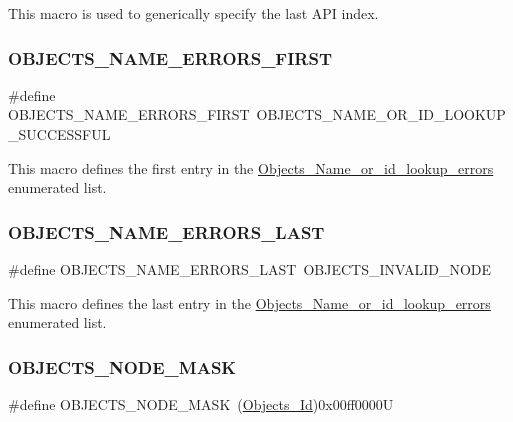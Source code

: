This macro is used to generically specify the last A\+PI index. \mbox{\label{group__RTEMSScoreObject_ga046df47371da1bd4f95bc63dcfea51c4}} 
\subsubsection{\texorpdfstring{OBJECTS\_NAME\_ERRORS\_FIRST}{OBJECTS\_NAME\_ERRORS\_FIRST}}
{\footnotesize\ttfamily \#define O\+B\+J\+E\+C\+T\+S\+\_\+\+N\+A\+M\+E\+\_\+\+E\+R\+R\+O\+R\+S\+\_\+\+F\+I\+R\+ST~O\+B\+J\+E\+C\+T\+S\+\_\+\+N\+A\+M\+E\+\_\+\+O\+R\+\_\+\+I\+D\+\_\+\+L\+O\+O\+K\+U\+P\+\_\+\+S\+U\+C\+C\+E\+S\+S\+F\+UL}

This macro defines the first entry in the \mbox{\hyperlink{group__RTEMSScoreObject_gaccfeec04954711c389b10aeccc91cabe}{Objects\+\_\+\+Name\+\_\+or\+\_\+id\+\_\+lookup\+\_\+errors}} enumerated list. \mbox{\label{group__RTEMSScoreObject_ga1452cd19bcd8b5e8a580729e854a1444}} 
\subsubsection{\texorpdfstring{OBJECTS\_NAME\_ERRORS\_LAST}{OBJECTS\_NAME\_ERRORS\_LAST}}
{\footnotesize\ttfamily \#define O\+B\+J\+E\+C\+T\+S\+\_\+\+N\+A\+M\+E\+\_\+\+E\+R\+R\+O\+R\+S\+\_\+\+L\+A\+ST~O\+B\+J\+E\+C\+T\+S\+\_\+\+I\+N\+V\+A\+L\+I\+D\+\_\+\+N\+O\+DE}

This macro defines the last entry in the \mbox{\hyperlink{group__RTEMSScoreObject_gaccfeec04954711c389b10aeccc91cabe}{Objects\+\_\+\+Name\+\_\+or\+\_\+id\+\_\+lookup\+\_\+errors}} enumerated list. \mbox{\label{group__RTEMSScoreObject_gaffe377d24973dea94eb29a2c4e8dc47d}} 
\subsubsection{\texorpdfstring{OBJECTS\_NODE\_MASK}{OBJECTS\_NODE\_MASK}}
{\footnotesize\ttfamily \#define O\+B\+J\+E\+C\+T\+S\+\_\+\+N\+O\+D\+E\+\_\+\+M\+A\+SK~(\mbox{\hyperlink{group__RTEMSScoreObject_ga5821f52a51072941bdd603e542d0863e}{Objects\+\_\+\+Id}})0x00ff0000U}

